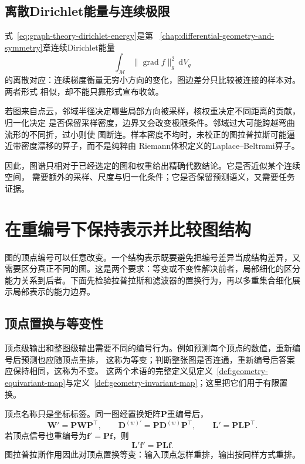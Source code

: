 \subsection{离散Dirichlet能量与连续极限}

式~\eqref{eq:graph-theory-dirichlet-energy}是第
~\ref{chap:differential-geometry-and-symmetry}章连续Dirichlet能量
\[
  \int_{\mathcal{M}}
  \lVert\operatorname{grad}f\rVert_g^2\,\mathrm{d}V_g
\]
的离散对应：连续梯度衡量无穷小方向的变化，图边差分只比较被连接的样本对。两者形式
相似，却不能只靠形式宣布收敛。

若图来自点云，邻域半径决定哪些局部方向被采样，核权重决定不同距离的贡献，归一化决定
是否保留采样密度，边界又会改变极限条件。邻域过大可能跨越弯曲流形的不同折，过小则使
图断连。样本密度不均时，未校正的图拉普拉斯可能逼近带密度漂移的算子，而不是纯粹由
Riemann体积定义的Laplace--Beltrami算子。

因此，图谱只相对于已经选定的图和权重给出精确代数结论。它是否近似某个连续空间，
需要额外的采样、尺度与归一化条件；它是否保留预测语义，又需要任务证据。

\section{在重编号下保持表示并比较图结构}
\label{sec:graph-theory-structure-comparison}

图的顶点编号可以任意改变。一个结构表示既要避免把编号差异当成结构差异，又需要区分真正不同的图。这是两个要求：等变或不变性解决前者，局部细化的区分能力关系到后者。下面先检验拉普拉斯和滤波器的置换行为，再以多重集合细化展示局部表示的能力边界。

\subsection{顶点置换与等变性}

顶点级输出和整图级输出需要不同的编号行为。例如预测每个顶点的数值，重新编号后预测也应随顶点重排，
这称为等变；判断整张图是否连通，重新编号后答案应保持相同，这称为不变。
这两个术语的完整定义见定义~\ref{def:geometry-equivariant-map}与定义~\ref{def:geometry-invariant-map}；这里把它们用于有限置换。

顶点名称只是坐标标签。同一图经置换矩阵\(\bm{P}\)重编号后，
\[
  \bm{W}'=\bm{P}\bm{W}\bm{P}^{\top},
  \qquad
  \bm{D}^{(w)\prime}=\bm{P}\bm{D}^{(w)}\bm{P}^{\top},
  \qquad
  \bm{L}'=\bm{P}\bm{L}\bm{P}^{\top}.
  \label{eq:graph-theory-laplacian-relabel}
\]
若顶点信号也重编号为\(\bm{f}'=\bm{P}\bm{f}\)，则
\[
  \bm{L}'\bm{f}'=\bm{P}\bm{L}\bm{f}.
\]
图拉普拉斯作用因此对顶点置换等变：输入顶点怎样重排，输出按同样方式重排。

